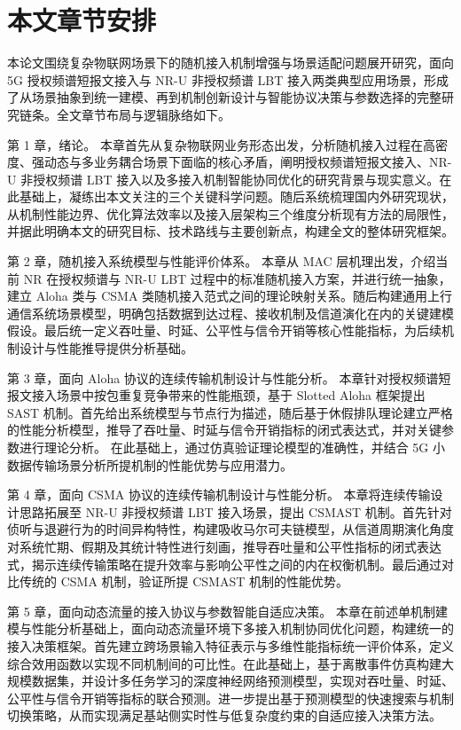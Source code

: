 \section{本文章节安排}
\label{sec:structure}

本论文围绕复杂物联网场景下的随机接入机制增强与场景适配问题展开研究，面向 5G 授权频谱短报文接入与 NR-U 非授权频谱 LBT 接入两类典型应用场景，形成了从场景抽象到统一建模、再到机制创新设计与智能协议决策与参数选择的完整研究链条。全文章节布局与逻辑脉络如下。

第 1 章，绪论。
本章首先从复杂物联网业务形态出发，分析随机接入过程在高密度、强动态与多业务耦合场景下面临的核心矛盾，阐明授权频谱短报文接入、NR-U 非授权频谱 LBT 接入以及多接入机制智能协同优化的研究背景与现实意义。在此基础上，凝练出本文关注的三个关键科学问题。随后系统梳理国内外研究现状，从机制性能边界、优化算法效率以及接入层架构三个维度分析现有方法的局限性，并据此明确本文的研究目标、技术路线与主要创新点，构建全文的整体研究框架。


第 2 章，随机接入系统模型与性能评价体系。
本章从 MAC 层机理出发，介绍当前 NR 在授权频谱与 NR-U LBT 过程中的标准随机接入方案，并进行统一抽象，建立 Aloha 类与 CSMA 类随机接入范式之间的理论映射关系。随后构建通用上行通信系统场景模型，明确包括数据到达过程、接收机制及信道演化在内的关键建模假设。最后统一定义吞吐量、时延、公平性与信令开销等核心性能指标，为后续机制设计与性能推导提供分析基础。


第 3 章，面向 Aloha 协议的连续传输机制设计与性能分析。
本章针对授权频谱短报文接入场景中按包重复竞争带来的性能瓶颈，基于 Slotted Aloha 框架提出 SAST 机制。首先给出系统模型与节点行为描述，随后基于休假排队理论建立严格的性能分析模型，推导了吞吐量、时延与信令开销指标的闭式表达式，并对关键参数进行理论分析。
在此基础上，通过仿真验证理论模型的准确性，并结合 5G 小数据传输场景分析所提机制的性能优势与应用潜力。

第 4 章，面向 CSMA 协议的连续传输机制设计与性能分析。
本章将连续传输设计思路拓展至 NR-U 非授权频谱 LBT 接入场景，提出 CSMAST 机制。首先针对侦听与退避行为的时间异构特性，构建吸收马尔可夫链模型，从信道周期演化角度对系统忙期、假期及其统计特性进行刻画，推导吞吐量和公平性指标的闭式表达式，揭示连续传输策略在提升效率与影响公平性之间的内在权衡机制。最后通过对比传统的 CSMA 机制，验证所提 CSMAST 机制的性能优势。

第 5 章，面向动态流量的接入协议与参数智能自适应决策。
本章在前述单机制建模与性能分析基础上，面向动态流量环境下多接入机制协同优化问题，构建统一的接入决策框架。首先建立跨场景输入特征表示与多维性能指标统一评价体系，定义综合效用函数以实现不同机制间的可比性。在此基础上，基于离散事件仿真构建大规模数据集，并设计多任务学习的深度神经网络预测模型，实现对吞吐量、时延、公平性与信令开销等指标的联合预测。进一步提出基于预测模型的快速搜索与机制切换策略，从而实现满足基站侧实时性与低复杂度约束的自适应接入决策方法。


